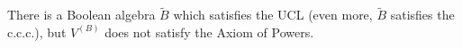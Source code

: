 There is a Boolean algebra $\tilde{B}$ which satisfies the UCL (even more, $\tilde{B}$ satisfies the c.c.c.), but $V^{(B)}$ does not satisfy the Axiom of Powers.
